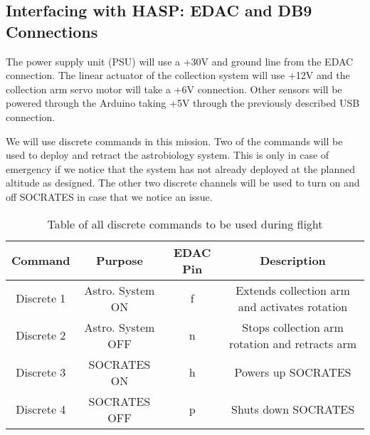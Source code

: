 \subsection{Interfacing with HASP: EDAC and DB9 Connections}

The power supply unit (PSU) will use a +30V and ground line from the EDAC connection. The linear actuator of the collection system will use +12V and the collection arm servo motor will take a +6V connection. Other sensors will be powered through the Arduino taking +5V through the previously described USB connection.  

We will use discrete commands in this mission. Two of the commands will be used to deploy and retract the astrobiology system. This is only in case of emergency if we notice that the system has not already deployed at the planned altitude as designed. The other two discrete channels will be used to turn on and off SOCRATES in case that we notice an issue.

\begin{table}[!ht]
  \centering
  \caption{Table of all discrete commands to be used during flight} 
  \label{tab:Dis-Commands}
  \bigskip
  \begin{tabular}{cccc}
    \hline
    \hline
    \multicolumn{1}{c}{\bfseries Command} & \multicolumn{1}{c}{\bfseries Purpose} &  \multicolumn{1}{c}{\bfseries EDAC Pin} & \multicolumn{1}{c}{\bfseries Description} \\
    \hline
    Discrete 1 & Astro. System ON & f & Extends collection arm and activates rotation \\
    Discrete 2 & Astro. System OFF & n & Stops collection arm rotation and retracts arm \\
    Discrete 3 & SOCRATES ON & h & Powers up SOCRATES \\
    Discrete 4 & SOCRATES OFF & p & Shuts down SOCRATES \\
    \hline
    \hline
  \end{tabular}
  \medskip
\end{table}

